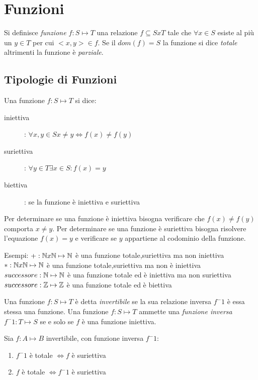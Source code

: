 \chapter{Funzioni}
Si definisce \textit{funzione $f:S \mapsto T$} una relazione $f \subseteq SxT$
tale che $\forall x \in S$ esiste al più un $y \in T$ per cui $<x,y> \in f$.\newline
Se il $dom(f) = S$ la funzione si dice \emph{totale} altrimenti la funzione è \emph{parziale}.

\section{Tipologie di Funzioni}
Una funzione $f:S \mapsto T$ si dice:
\begin{description}
    \item[iniettiva]: $\forall x,y \in S x \neq y \iff f(x) \neq f(y)$
    \item[suriettiva]: $\forall y \in T \exists x \in S : f(x) = y$
    \item[biettiva]: se la funzione è iniettiva e suriettiva
\end{description}

Per determinare se una funzione è iniettiva bisogna verificare che $f(x) \neq f(y)$
comporta $x \neq y$.
Per determinare se una funzione è suriettiva bisogna risolvere l'equazione $f(x) = y$
e verificare se $y$ appartiene al codominio della funzione.

Esempi:
$+:\mathbb{N} x \mathbb{N} \mapsto \mathbb{N}$ è una funzione totale,suriettiva ma non iniettiva
$*:\mathbb{N} x \mathbb{N} \mapsto \mathbb{N}$ è una funzione totale,suriettiva ma non è iniettiva
$successore:\mathbb{N} \mapsto \mathbb{N}$ è una funzione totale ed è iniettiva ma non suriettiva
$successore:\mathbb{Z} \mapsto \mathbb{Z}$ è una funzione totale ed è biettiva

Una funzione $f:S \mapsto T$ è detta \emph{invertibile} se la sua relazione inversa
$f ^ -1$ è essa stessa una funzione.\newline
Una funzione $f:S \mapsto T$ ammette una \emph{funzione inversa} $f ^ -1 :T \mapsto S$
se e solo se $f$ è una funzione iniettiva.

\begin{thm}
Sia $f:A \mapsto B$ invertibile, con funzione inversa $f ^ -1$:
\begin{enumerate}
    \item $f^-1$ è totale $\iff f$ è suriettiva
    \item $f$ è totale $\iff f^-1$ è suriettiva
\end{enumerate}
\end{thm}

